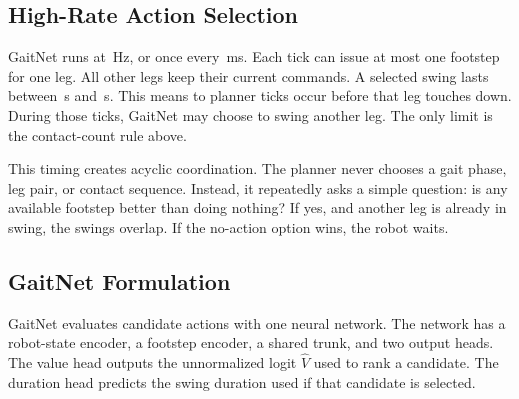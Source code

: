 \subsection{High-Rate Action Selection}
\label{subsec:methodology-high-rate-selection}

GaitNet runs at \corlControlHz\,Hz, or once every
\corlControlTickMs\,ms. Each tick can issue at most one footstep for
one leg. All other legs keep their current commands. A selected swing
lasts between \corlSwingDurationMin\,s and
\corlSwingDurationMax\,s. This means
\numberstringnum{\corlMinTicksPerSwing} to
\numberstringnum{\corlMaxTicksPerSwing} planner ticks occur before
that leg touches down. During those ticks, GaitNet may choose to
swing another leg. The only limit is the contact-count rule above.

This timing creates acyclic coordination. The planner never chooses a
gait phase, leg pair, or contact sequence. Instead, it repeatedly asks
a simple question: is any available footstep better than doing
nothing? If yes, and another leg is already in swing, the swings
overlap. If the no-action option wins, the robot waits.

\subsection{GaitNet Formulation}
\label{subsec:methodology-gaitnet-architecture}

GaitNet evaluates candidate actions with one neural network. The
network has a robot-state encoder, a footstep encoder, a shared trunk,
and two output heads. The value head outputs the unnormalized logit
$\hat{V}$ used to rank a candidate. The duration head predicts the
swing duration used if that candidate is selected.

